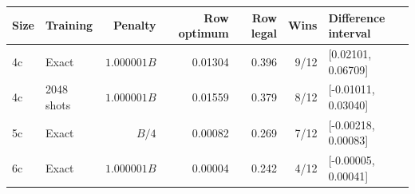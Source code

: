 \begin{tabular}{llrrrrl}
\toprule
Size & Training & Penalty & Row optimum & Row legal & Wins & Difference interval\\
\midrule
4c & Exact & $1.000001B$ & 0.01304 & 0.396 & 9/12 & [0.02101, 0.06709]\\
4c & 2048 shots & $1.000001B$ & 0.01559 & 0.379 & 8/12 & [-0.01011, 0.03040]\\
5c & Exact & $B/4$ & 0.00082 & 0.269 & 7/12 & [-0.00218, 0.00083]\\
6c & Exact & $1.000001B$ & 0.00004 & 0.242 & 4/12 & [-0.00005, 0.00041]\\
\bottomrule
\end{tabular}
